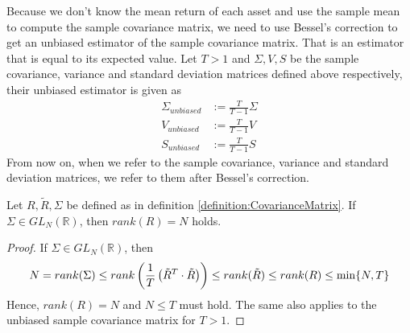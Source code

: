         \begin{remark}
            Because we don't know the mean return of each asset and use the sample mean to compute the sample covariance matrix, we need to use Bessel's correction to get an unbiased estimator of the sample covariance matrix. That is an estimator that is equal to its expected value. Let $T > 1$ and $\Sigma, V, S$ be the sample covariance, variance and standard deviation matrices defined above respectively, their unbiased estimator is given as
            \begin{align*}
                \Sigma_{unbiased} &:= \frac{T}{T-1} \Sigma \\
                V_{unbiased} &:= \frac{T}{T-1} V \\
                S_{unbiased} &:= \frac{T}{T-1} S
            \end{align*}
            From now on, when we refer to the sample covariance, variance and standard deviation matrices, we refer to them after Bessel's correction.
        \end{remark}
        
        \begin{theorem}\label{theorem:CovarianceMatrixRank}
            Let $R, \tilde{R}, \Sigma$ be defined as in definition \ref{definition:CovarianceMatrix}. If $\Sigma \in GL_N(\mathbb{R})$, then $rank(R) = N$ holds.
        \end{theorem}
        
        \begin{proof}
            If $\Sigma \in GL_N(\mathbb{R})$, then
            \begin{align*}
                N = rank(\Sigma) \leq rank \left( \frac{1}{T} \left( \Tilde{R}^T \cdot \Tilde{R} \right) \right) \leq rank(\Tilde{R}) \leq rank(R) \leq \min \{ N, T \}
            \end{align*}
            Hence, $rank(R) = N$ and $N \leq T$ must hold. The same also applies to the unbiased sample covariance matrix for $T > 1$.
        \end{proof}
    
